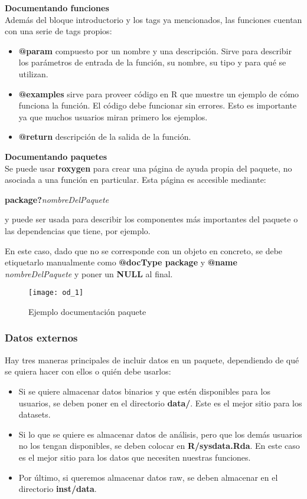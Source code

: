 \textbf{Documentando funciones} \\
Adem\'as del bloque introductorio y los tags ya mencionados, las funciones cuentan con una
serie de tags propios:
\begin{itemize}
    \item \textbf{@param} compuesto por un nombre y una descripci\'on. Sirve para describir los
par\'ametros de entrada de la funci\'on, su nombre, su tipo y para qu\'e se utilizan.
    \item \textbf{@examples} sirve para proveer c\'odigo en R que muestre un ejemplo de c\'omo funciona
la funci\'on. El c\'odigo debe funcionar sin errores. Esto es importante ya que muchos
usuarios miran primero los ejemplos.
    \item \textbf{@return} descripci\'on de la salida de la funci\'on.
\end{itemize}

\textbf{Documentando paquetes}\\
Se puede usar \textbf{roxygen} para crear una p\'agina de ayuda propia del paquete, no asociada a
una funci\'on en particular. Esta p\'agina es accesible mediante:
\begin{center}
    \textbf{package?}\textit{nombreDelPaquete} 
\end{center}
y puede ser usada para describir los componentes m\'as importantes del paquete o las
dependencias que tiene, por ejemplo.

En este caso, dado que no se corresponde con un objeto en concreto, se debe etiquetarlo
manualmente como \textbf{@docType package} y \textbf{@name} \textit{nombreDelPaquete} y poner un \textbf{NULL} al final.

\begin{figure}[H]
    \centering
    \texttt{[image: od\_1]}
    \caption{Ejemplo documentaci\'on paquete }
    \label{fig:paquete}
\end{figure} 

\subsubsection{Datos externos}

Hay tres maneras principales de incluir datos en un paquete, dependiendo de qu\'e se quiera
hacer con ellos o qui\'en debe usarlos:

\begin{itemize}
    \item Si se quiere almacenar datos binarios y que est\'en disponibles para los usuarios, se
deben poner en el directorio \textbf{data/}. Este es el mejor sitio para los datasets.
    \item Si lo que se quiere es almacenar datos de an\'alisis, pero que los dem\'as usuarios no
los tengan disponibles, se deben colocar en \textbf{R/sysdata.Rda}. En este caso es el mejor
sitio para los datos que necesiten nuestras funciones.
    \item Por \'ultimo, si queremos almacenar datos raw, se deben almacenar en el directorio
\textbf{inst/data}.
\end{itemize}

